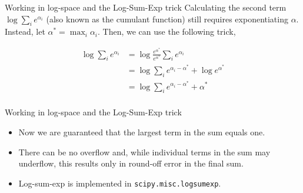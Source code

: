 \documentclass[serif,xcolor=pdftex,dvipsnames,table,hyperref={bookmarks=false,breaklinks}]{beamer}
\begin{document}
\begin{frame}[t]{Working in log-space and the Log-Sum-Exp trick}
	Calculating the second term $\log \sum_i e^{\alpha_i}$ (also known as the cumulant function) still requires exponentiating $\alpha$. Instead, let $\alpha^* = \max_i \alpha_i$. Then, we can use the following trick,
	
	\begin{align*}
		\log \sum_i e^{\alpha_i} &= \log \frac{e^{\alpha^*}}{e^{\alpha^*}}\sum_i e^{\alpha_i}\\
		&= \log \sum_i e^{\alpha_i-\alpha^*} + \log e^{\alpha^*}\\
		&= \log \sum_i e^{\alpha_i-\alpha^*} + \alpha^*\\
	\end{align*}
\end{frame}
	
\begin{frame}[t,fragile]{Working in log-space and the Log-Sum-Exp trick}
	\begin{itemize}[<+->]
		\item Now we are guaranteed that the largest term in the sum equals one.
		\item There can be no overflow and, while individual terms in the sum may underflow, this results only in round-off error in the final sum.
		\item Log-sum-exp is implemented in \verb|scipy.misc.logsumexp|.
	\end{itemize}
\end{frame}

%
%
%
\end{document}
